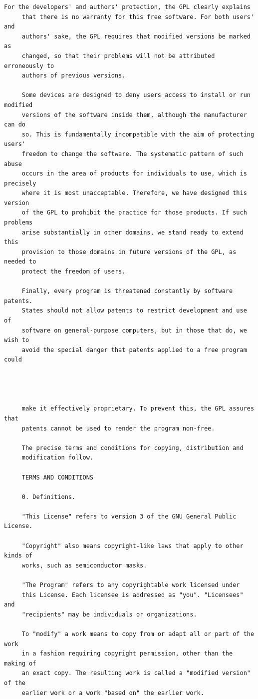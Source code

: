 \begin{lstlisting}[basicstyle=\ttfamily\footnotesize,breaklines=true]
     For the developers' and authors' protection, the GPL clearly explains
     that there is no warranty for this free software. For both users' and
     authors' sake, the GPL requires that modified versions be marked as
     changed, so that their problems will not be attributed erroneously to
     authors of previous versions.

     Some devices are designed to deny users access to install or run modified
     versions of the software inside them, although the manufacturer can do
     so. This is fundamentally incompatible with the aim of protecting users'
     freedom to change the software. The systematic pattern of such abuse
     occurs in the area of products for individuals to use, which is precisely
     where it is most unacceptable. Therefore, we have designed this version
     of the GPL to prohibit the practice for those products. If such problems
     arise substantially in other domains, we stand ready to extend this
     provision to those domains in future versions of the GPL, as needed to
     protect the freedom of users.

     Finally, every program is threatened constantly by software patents.
     States should not allow patents to restrict development and use of
     software on general-purpose computers, but in those that do, we wish to
     avoid the special danger that patents applied to a free program could




     make it effectively proprietary. To prevent this, the GPL assures that
     patents cannot be used to render the program non-free.

     The precise terms and conditions for copying, distribution and
     modification follow.

     TERMS AND CONDITIONS

     0. Definitions.

     "This License" refers to version 3 of the GNU General Public License.

     "Copyright" also means copyright-like laws that apply to other kinds of
     works, such as semiconductor masks.

     "The Program" refers to any copyrightable work licensed under
     this License. Each licensee is addressed as "you". "Licensees" and
     "recipients" may be individuals or organizations.

     To "modify" a work means to copy from or adapt all or part of the work
     in a fashion requiring copyright permission, other than the making of
     an exact copy. The resulting work is called a "modified version" of the
     earlier work or a work "based on" the earlier work.


\end{lstlisting}
